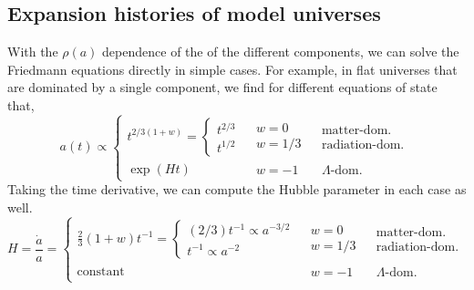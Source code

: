 \subsection{Expansion histories of model universes}
With the $\rho(a)$ dependence of the of the different components, we can solve the Friedmann equations directly in simple cases.  For example, in flat universes that are dominated by a single component, we find for different equations of state that,
\begin{equation}
  a(t) \propto \left\{
  \begin{array}{lll}
    t^{2/3(1+w)}  = \left\{ \begin{array}{l} t^{2/3}\\ t^{1/2} \end{array} \right. & \begin{array}{l} w=0  \\ w = 1/3 \end{array} &  \begin{array}{l} \mbox{matter-dom.}  \\ \mbox{radiation-dom.} \end{array} \\
    \exp(Ht) & \begin{array}{l}w = -1 \end{array}& \begin{array}{l} \Lambda\mbox{-dom.} \end{array}
  \end{array}
  \right. 
\end{equation}
Taking the time derivative, we can compute the Hubble parameter in each case as well.
\begin{equation}
  H = \frac{\dot a}{a} = \left\{
  \begin{array}{lll}
    \frac{2}{3}(1+w) t^{-1} =  \left\{ \begin{array}{l} (2/3) t^{-1} \propto a^{-3/2} \\ t^{-1} \propto a^{-2} \end{array} \right. & \begin{array}{l} w=0  \\ w = 1/3 \end{array} &  \begin{array}{l} \mbox{matter-dom.}  \\ \mbox{radiation-dom.} \end{array} \\
    \mbox{constant} & \begin{array}{l}w = -1 \end{array}& \begin{array}{l} \Lambda\mbox{-dom.} \end{array}
  \end{array}
  \right. 
\end{equation}

